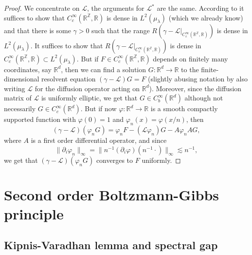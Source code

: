 \documentclass[11pt, a4paper]{article}
\newcommand{\cdummy}{\cdot}
\newcommand{\CL}{\mathcal{L}}
\newcommand{\1}{\mathbf{1}}
\begin{document}
\begin{proof}
  We concentrate on $\CL$, the
  arguments for $\CL^\ast$ are the same. 
  According to \cite[Proposition~1.3.1]{bib:ethierKurtz} it
  suffices to show that $C^{\infty}_c (\mathbb{R}^{\mathbb{Z}},
  \mathbb{R})$ is dense in $L^2 ({\mu}_{\lambda})$ (which we already
  know) and that there is some $\gamma > 0$ such that the range $R (
  \gamma - \CL |_{C^{\infty}_c (\mathbb{R}^{\mathbb{Z}}, \mathbb{R})}
  )$ is dense in $L^2
  ({\mu}_{\lambda})$.  It suffices
  to show that $R ( \gamma - \CL |_{C^{\infty}_c
  (\mathbb{R}^{\mathbb{Z}}, \mathbb{R})} )$ is dense in $C^{\infty}_c
  (\mathbb{R}^{\mathbb{Z}}, \mathbb{R}) \subset L^2 ({\mu}_{\lambda})$.
  But if $F \in C^{\infty}_c (\mathbb{R}^{\mathbb{Z}}, \mathbb{R})$ depends
  on finitely many coordinates, say $\mathbb{R}^d$, then we can find a
  solution $G : \mathbb{R}^d \rightarrow \mathbb{R}$ to the
  finite-dimensional resolvent equation $\left( \gamma - \CL \right) G = F$
  (slightly abusing notation by also writing $\CL$ for the diffusion operator
  acting on $\mathbb{R}^d$). Moreover, since the diffusion matrix of $\CL$ is
  uniformly elliptic, we get that $G \in C^{\infty}_b (\mathbb{R}^d)$
  although not necessarily $G \in C^{\infty}_c (\mathbb{R}^d)$. But if now
  $\varphi : \mathbb{R}^d \rightarrow \mathbb{R}$ is a smooth compactly
  supported function with $\varphi(0) = 1$ and $\varphi_n (x) = \varphi (x / n)$, then
  \[ \left( \gamma - \CL \right) (\varphi_n G) = \varphi_n F - \left( \CL
     \varphi_n \right) G - A \varphi_n A G, \]
  where $A$ is a first order differential operator, and since
  \[ \| \partial_i \varphi_n \|_{\infty} = \| n^{- 1} (\partial_i \varphi)
     (n^{- 1} \cdummy) \|_{\infty} \lesssim n^{- 1}, \]
  we get that $\left( \gamma - \CL \right) (\varphi_n G)$ converges to $F$ uniformly.
\end{proof}

\section{Second order Boltzmann-Gibbs principle}\label{sec:second-order-BG}

\subsection{Kipnis-Varadhan lemma and spectral gap}\label{sec:kipnisVaradhan}
\end{document}
